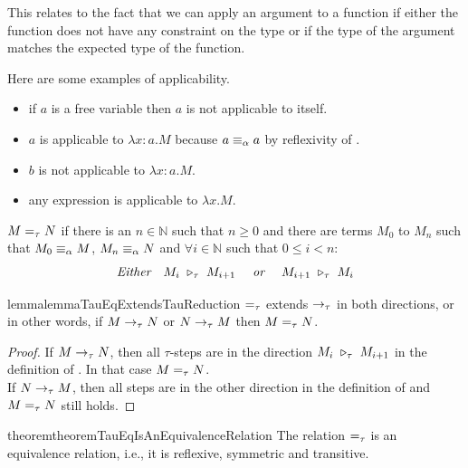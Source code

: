 This relates to the fact that we can apply an argument to a function if either the function does not have any constraint on the type or if the type of the argument matches the expected type of the function. 

\begin{examples}
    Here are some examples of applicability.
    \begin{itemize}
        \item if $a$ is a free variable then $a$ is not applicable to itself.
        \item $a$ is applicable to $\lambda x:a.M$ because $a \equiv_\alpha a$ by reflexivity of \alphaequivalence.
        \item $b$ is not applicable to $\lambda x:a.M$.
        \item any expression is applicable to $\lambda x.M$.
    \end{itemize}
\end{examples}

\begin{definition}
    $M =_{\tau} N$ if there is an $n \in \mathbb{N}$ such that $n \geq 0$ and there are terms $M_{0}$ to $M_{n}$ such that $M_{0} \equiv_\alpha M$, $M_{n} \equiv_\alpha N$ and $\forall i \in \mathbb{N}$ such that $0 \leq i < n$:
\[
\textit{Either}\quad M_{i} \ \triangleright_{\tau}\  M_{i+1}\quad\textit{ or }\quad M_{i+1} \ \triangleright_{\tau}\  M_{i}
\]
\end{definition}

\begin{reusable}{lemma}{lemmaTauEqExtendsTauReduction}
    $=_{\tau}$ extends $\to_{\tau}$ in both directions, or in other words, if $M \to_{\tau} N$ or $N \to_{\tau} M$ then $M =_{\tau} N$.
\end{reusable}

\begin{proof}
If $M \to_{\tau} N$, then all $\tau$-steps are in the direction $M_{i} \ \triangleright_{\tau}\  M_{i+1}$ in the definition of \tauequivalence. In that case $M =_{\tau} N$.\\
If $N \to_{\tau} M$, then all steps are in the other direction in the definition of \tauequivalence and $M =_{\tau} N$ still holds.
\end{proof}

\begin{reusable}{theorem}{theoremTauEqIsAnEquivalenceRelation}
    The relation $=_{\tau}$ is an equivalence relation, i.e., it is reflexive, symmetric and transitive.
\end{reusable}

